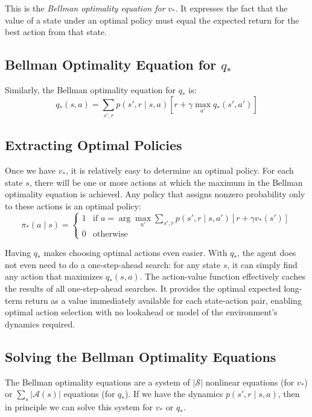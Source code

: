 \documentclass[12pt]{article}
\begin{document}
This is the \textit{Bellman optimality equation for} $v_*$. It expresses the fact that the value of a state under an optimal policy must equal the expected return for the best action from that state.

\subsection{Bellman Optimality Equation for $q_*$}

Similarly, the Bellman optimality equation for $q_*$ is:
\begin{equation}
q_*(s, a) = \sum_{s', r} p(s', r \mid s, a)\left[r + \gamma \max_{a'} q_*(s', a')\right]
\end{equation}

\subsection{Extracting Optimal Policies}

Once we have $v_*$, it is relatively easy to determine an optimal policy. For each state $s$, there will be one or more actions at which the maximum in the Bellman optimality equation is achieved. Any policy that assigns nonzero probability only to these actions is an optimal policy:
\begin{equation}
\pi_*(a \mid s) = \begin{cases}
1 & \text{if } a = \arg\max_{a'} \sum_{s', r} p(s', r \mid s, a')[r + \gamma v_*(s')] \\
0 & \text{otherwise}
\end{cases}
\end{equation}

Having $q_*$ makes choosing optimal actions even easier. With $q_*$, the agent does not even need to do a one-step-ahead search: for any state $s$, it can simply find any action that maximizes $q_*(s, a)$. The action-value function effectively caches the results of all one-step-ahead searches. It provides the optimal expected long-term return as a value immediately available for each state-action pair, enabling optimal action selection with no lookahead or model of the environment's dynamics required.

\subsection{Solving the Bellman Optimality Equations}

The Bellman optimality equations are a system of $|\mathcal{S}|$ nonlinear equations (for $v_*$) or $\sum_s |\mathcal{A}(s)|$ equations (for $q_*$). If we have the dynamics $p(s', r \mid s, a)$, then in principle we can solve this system for $v_*$ or $q_*$.
\end{document}
